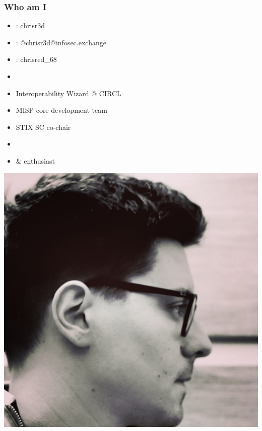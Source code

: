 
\begin{frame}[t,plain]
\titlepage
\end{frame}

\begin{frame}
    \frametitle{Who am I}
    \begin{minipage}{0.6\textwidth}
        \begin{itemize}
            \item \faGithub : chrisr3d \\
            \item \faMastodon : @chrisr3d@infosec.exchange
            \item \faTwitter : chrisred\_68
            \item []
            \item Interoperability Wizard @ CIRCL
            \item MISP core development team
            \item STIX SC co-chair
            \item []
            \item \faCat \vspace{1em} \& \faCamera \vspace{1em} enthusiast
        \end{itemize}
    \end{minipage}%
    \begin{minipage}{0.4\textwidth}
        \includegraphics[scale=0.1]{images/profile_picture.jpg}
    \end{minipage}
\end{frame}

